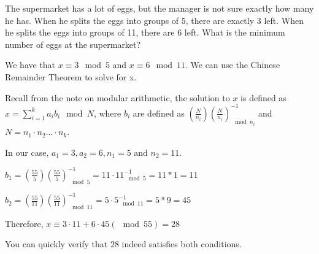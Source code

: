 \question The supermarket has a lot of eggs, but the manager is not sure exactly how many he has. When he splits the eggs into groups of 5, there are exactly 3 left. When he splits the eggs into groups of 11, there are 6 left. What is the minimum number of eggs at the supermarket?
\begin{solution}[1.5 in]
We have that $x \equiv 3 \mod 5$ and $x \equiv 6 \mod 11$. We can use the Chinese Remainder Theorem to solve for x.

Recall from the note on modular arithmetic, the solution to $x$ is defined as $x = \sum_{i=1}^k a_i b_i \mod N$, where $b_i$ are defined as $\left(\frac{N}{n_i} \right) \left(\frac{N}{n_i} \right)^{-1}_{\mod n_i}$ and $N = n_1 \cdot n_2 ... \cdot n_k$.

In our case, $a_1 = 3, a_2 = 6, n_1 = 5$ and $n_2 = 11$. 

$b_1 = \left(\frac{55}{5} \right) \left(\frac{55}{5} \right)^{-1}_{\mod 5} = 11 \cdot 11^{-1}_{\mod 5} = 11 * 1 = 11$

$b_2 = \left(\frac{55}{11} \right) \left(\frac{55}{11} \right)^{-1}_{\mod 11} = 5 \cdot 5^{-1}_{\mod 11} = 5 * 9 = 45$

Therefore, $x \equiv 3 \cdot 11 + 6 \cdot 45 (\mod 55) = 28$

You can quickly verify that $28$ indeed satisfies both conditions.

\end{solution}
